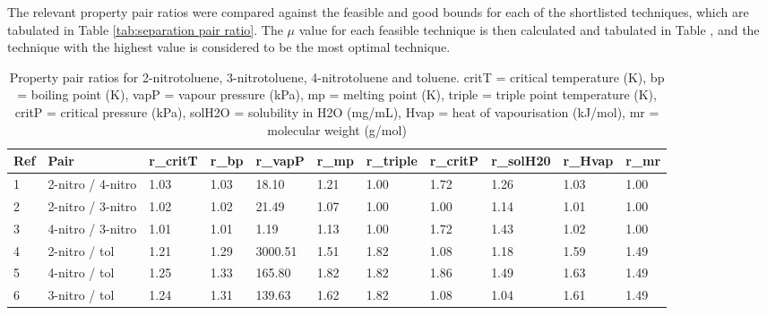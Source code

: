 The relevant property pair ratios were compared against the feasible and good bounds for each of the shortlisted techniques, which are tabulated in Table \ref{tab:separation pair ratio}. The $\mu$ value for each feasible technique is then calculated and tabulated in Table , and the technique with the highest value is considered to be the most optimal technique. 


\begin{table}[h]
\centering
\caption{Property pair ratios for 2-nitrotoluene, 3-nitrotoluene, 4-nitrotoluene and toluene. critT = critical temperature (K), bp = boiling point (K), vapP = vapour pressure (kPa), mp = melting point (K), triple = triple point temperature (K), critP = critical pressure (kPa), solH2O = solubility in H2O (mg/mL), Hvap = heat of vapourisation (kJ/mol), mr = molecular weight (g/mol)}
\label{tab:jaksland}\footnotesize
\begin{tabular}{@{}lllllllllll@{}}
\toprule
Ref & Pair              & r\_critT & r\_bp & r\_vapP & r\_mp & r\_triple & r\_critP & r\_solH20 & r\_Hvap & r\_mr \\ \midrule
1   & 2-nitro / 4-nitro & 1.03     & 1.03  & 18.10   & 1.21  & 1.00      & 1.72     & 1.26      & 1.03    & 1.00  \\
2   & 2-nitro / 3-nitro & 1.02     & 1.02  & 21.49   & 1.07  & 1.00      & 1.00     & 1.14      & 1.01    & 1.00  \\
3   & 4-nitro / 3-nitro & 1.01     & 1.01  & 1.19    & 1.13  & 1.00      & 1.72     & 1.43      & 1.02    & 1.00  \\
4   & 2-nitro / tol     & 1.21     & 1.29  & 3000.51 & 1.51  & 1.82      & 1.08     & 1.18      & 1.59    & 1.49  \\
5   & 4-nitro / tol     & 1.25     & 1.33  & 165.80  & 1.82  & 1.82      & 1.86     & 1.49      & 1.63    & 1.49  \\
6   & 3-nitro / tol     & 1.24     & 1.31  & 139.63  & 1.62  & 1.82      & 1.08     & 1.04      & 1.61    & 1.49  \\ \bottomrule
\end{tabular}
\end{table}


